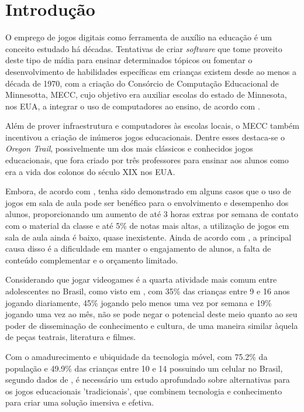 \chapter{Introdução}

O emprego de jogos digitais como ferramenta de auxílio na educação é um conceito estudado há décadas. Tentativas de criar \textit{software} que tome proveito deste tipo de mídia para ensinar determinados tópicos ou fomentar o desenvolvimento de habilidades específicas em crianças existem desde ao menos a década de 1970, com a criação do Consórcio de Computação Educacional de Minnesotta, MECC, cujo objetivo era auxiliar escolas do estado de Minnesota, nos EUA, a integrar o uso de computadores ao ensino, de acordo com \cite{lussenhop:2016:oregon-trail}.

Além de prover infraestrutura e computadores às escolas locais, o MECC também incentivou a criação de inúmeros jogos educacionais. Dentre esses destaca-se o \textit{Oregon Trail}, possivelmente um dos mais clássicos e conhecidos jogos educacionais, que fora criado por três professores para ensinar aos alunos como era a vida dos colonos do século XIX nos EUA. 

Embora, de acordo com \cite{poli:2012:video-game-spore}, tenha sido demonstrado em alguns casos que o uso de jogos em sala de aula pode ser benéfico para o envolvimento e desempenho dos alunos, proporcionando um aumento de até 3 horas extras por semana de contato com o material da classe e até 5\% de notas mais altas, a utilização de jogos em sala de aula ainda é baixo, quase inexistente. Ainda de acordo com \cite{poli:2012:video-game-spore}, a principal causa disso é a dificuldade em manter o engajamento de alunos, a falta de conteúdo complementar e o orçamento limitado.

Considerando que jogar videogames é a quarta atividade mais comum entre adolescentes no Brasil, como visto em \cite{bndes:2014:mapeamento}, com 35\% das crianças entre 9 e 16 anos jogando diariamente, 45\% jogando pelo menos uma vez por semana e 19\% jogando uma vez ao mês, não se pode negar o potencial deste meio quanto ao seu poder de disseminação de conhecimento e cultura, de uma maneira similar àquela de peças teatrais, literatura e filmes.

Com o amadurecimento e ubiquidade da tecnologia móvel, com 75.2\% da população e 49.9\% das crianças entre 10 e 14 possuindo um celular no Brasil, segundo dados de \cite{IBGE:2015:PNAD_TIC_2013}, é necessário um estudo aprofundado sobre alternativas para os jogos educacionais 'tradicionais', que combinem tecnologia e conhecimento para criar uma solução imersiva e efetiva.

